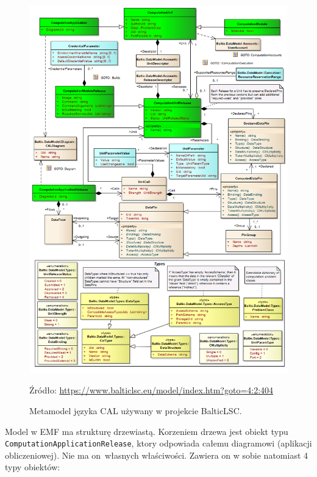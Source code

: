 \begin{figure}[!hb]
	\centering


	\includegraphics[width=0.82\linewidth]{./images/cal-metamodel-balticlsc.png}
	\caption{Metamodel języka CAL używany w projekcie
		BalticLSC\@.}\label{rys:cal-metamodel-balticlsc}

	\medskip
	{\small Źródło:
		\url{https://www.balticlsc.eu/model/index.htm?goto=4:2:404}}
\end{figure}

Model w EMF ma strukturę drzewiastą. Korzeniem drzewa jest obiekt typu
\texttt{ComputationApplicationRelease}, ktory odpowiada całemu diagramowi
(aplikacji obliczeniowej). Nie
ma on~własnych właściwości. Zawiera on w sobie natomiast 4 typy obiektów:

